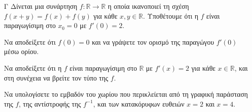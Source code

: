 \begin{thema}{Γ}
Δίνεται μια συνάρτηση $f: \mathbb{R} \to \mathbb{R}$ η οποία ικανοποιεί τη σχέση $f(x+y) = f(x) + f(y)$ για κάθε $x, y \in \mathbb{R}$. Υποθέτουμε ότι η $f$ είναι παραγωγίσιμη στο $x_0=0$ με $f'(0) = 2$.
\begin{erwthma}
  \item Να αποδείξετε ότι $f(0) = 0$ και να γράψετε τον ορισμό της παραγώγου $f'(0)$ μέσω ορίου.
  \item Να αποδείξετε ότι η $f$ είναι παραγωγίσιμη στο $\mathbb{R}$ με $f'(x) = 2$ για κάθε $x \in \mathbb{R}$, και στη συνέχεια να βρείτε τον τύπο της $f$.
  \item Να υπολογίσετε το εμβαδόν του χωρίου που περικλείεται από τη γραφική παράσταση της $f$, της αντίστροφής της $f^{-1}$, και των κατακόρυφων ευθειών $x=2$ και $x=4$.
\end{erwthma}
\end{thema}
